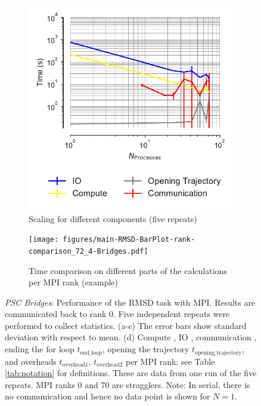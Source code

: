 \begin{figure}[!htb]
  \begin{subfigure}{.4\textwidth}
    \includegraphics[width=\linewidth]{figures/main-RMSD-time_comp_IO_comparison-Bridges.pdf}
    \captionsetup{format=hang}
    \caption{Scaling for different components (five repeats)}
    \label{fig:ScalingComputeIO-Bridges}
  \end{subfigure}
  \hfill
  \begin{subfigure} {.5\textwidth}
    \texttt{[image: figures/main-RMSD-BarPlot-rank-comparison\_72\_4-Bridges.pdf]}
    \captionsetup{format=hang}
    \caption{Time comparison on different parts of the calculations per MPI rank (example)}
    \label{fig:MPIranks-Bridges}
  \end{subfigure}
  \caption{\emph{PSC Bridges}: Performance of the RMSD task with MPI.
    Results are communicated back to rank 0.
    Five independent repeats were performed to collect statistics.
    (a-c) The error bars show standard deviation with respect to mean. (d) Compute \tcomp, IO \tIO, communication \tcomm, ending the for loop $t_{\text{end\_loop}}$, opening the trajectory $t_{\text{opening\_trajectory}}$, and overheads $t_{\text{overhead1}}$, $t_{\text{overhead2}}$ per MPI rank; see Table \ref{tab:notation} for definitions.
    These are data from one run of the five repeats.
    MPI ranks 0 and 70 are stragglers.
    Note: In serial, there is no communication and hence no data point is shown for $N=1$.}
\label{fig:MPIwithIO-Bridges}
\end{figure} 



